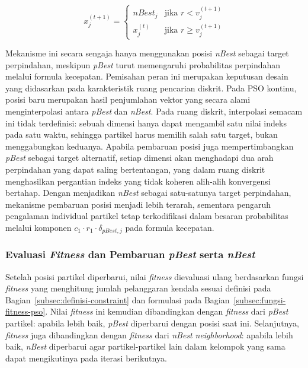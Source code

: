 \begin{equation}
	x_j^{(t+1)} = \begin{cases} nBest_j & \text{jika } r < v_j^{(t+1)} \\ x_j^{(t)} & \text{jika } r \geq v_j^{(t+1)} \end{cases}
	\label{eq:pso-position-update}
\end{equation}

Mekanisme ini secara sengaja hanya menggunakan posisi \textit{nBest} sebagai target perpindahan, meskipun \textit{pBest} turut memengaruhi probabilitas perpindahan melalui formula kecepatan. Pemisahan peran ini merupakan keputusan desain yang didasarkan pada karakteristik ruang pencarian diskrit. Pada PSO kontinu, posisi baru merupakan hasil penjumlahan vektor yang secara alami menginterpolasi antara \textit{pBest} dan \textit{nBest}. Pada ruang diskrit, interpolasi semacam ini tidak terdefinisi: sebuah dimensi hanya dapat mengambil satu nilai indeks pada satu waktu, sehingga partikel harus memilih salah satu target, bukan menggabungkan keduanya. Apabila pembaruan posisi juga mempertimbangkan \textit{pBest} sebagai target alternatif, setiap dimensi akan menghadapi dua arah perpindahan yang dapat saling bertentangan, yang dalam ruang diskrit menghasilkan pergantian indeks yang tidak koheren alih-alih konvergensi bertahap. Dengan menjadikan \textit{nBest} sebagai satu-satunya target perpindahan, mekanisme pembaruan posisi menjadi lebih terarah, sementara pengaruh pengalaman individual partikel tetap terkodifikasi dalam besaran probabilitas melalui komponen $c_1 \cdot r_1 \cdot \delta_{pBest,j}$ pada formula kecepatan.

\subsubsection{Evaluasi \textit{Fitness} dan Pembaruan \textit{pBest} serta \textit{nBest}}

Setelah posisi partikel diperbarui, nilai \textit{fitness} dievaluasi ulang berdasarkan fungsi \textit{fitness} yang menghitung jumlah pelanggaran kendala sesuai definisi pada Bagian~\ref{subsec:definisi-constraint} dan formulasi pada Bagian~\ref{subsec:fungsi-fitness-pso}. Nilai \textit{fitness} ini kemudian dibandingkan dengan \textit{fitness} dari \textit{pBest} partikel: apabila lebih baik, \textit{pBest} diperbarui dengan posisi saat ini. Selanjutnya, \textit{fitness} juga dibandingkan dengan \textit{fitness} dari \textit{nBest} \textit{neighborhood}: apabila lebih baik, \textit{nBest} diperbarui agar partikel-partikel lain dalam kelompok yang sama dapat mengikutinya pada iterasi berikutnya.

